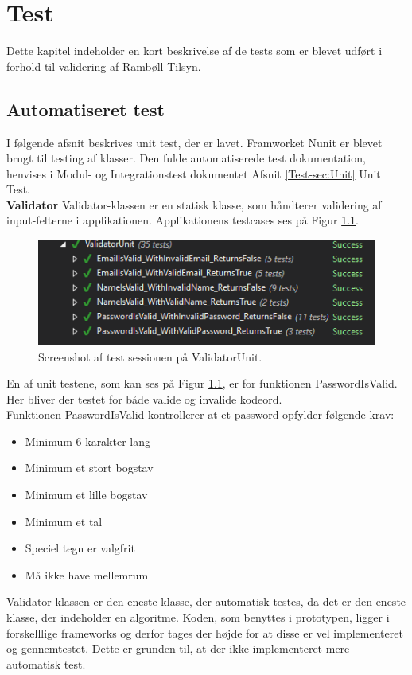 \chapter{Test}
Dette kapitel indeholder en kort beskrivelse af de tests som er blevet udført i forhold til validering af Rambøll Tilsyn. \\

\section{Automatiseret test}
I følgende afsnit beskrives unit test, der er lavet. Framworket Nunit\cite{NUnit} er blevet brugt til testing af klasser. Den fulde automatiserede test dokumentation, henvises i Modul- og Integrationstest dokumentet Afsnit \ref{Test-sec:Unit} Unit Test. \\

\textbf{Validator}
Validator-klassen er en statisk klasse, som håndterer validering af input-felterne i applikationen. Applikationens testcases ses på Figur \ref{fig:ValidatorUnit}.
\begin{figure}[H]
	\centering
	\includegraphics[width=0.6\linewidth]{Test/ValidatorUnit}
	\caption{Screenshot af test sessionen på ValidatorUnit.}
	\label{fig:ValidatorUnit}
\end{figure}

En af unit testene, som kan ses på Figur \ref{fig:ValidatorUnit}, er for funktionen PasswordIsValid. Her bliver der testet for både valide og invalide kodeord.\\
Funktionen PasswordIsValid kontrollerer at et password opfylder følgende krav:
\begin{itemize}
	\item Minimum 6 karakter lang
	\item Minimum et stort bogstav
	\item Minimum et lille bogstav
	\item Minimum et tal
	\item Speciel tegn er valgfrit
	\item Må ikke have mellemrum
\end{itemize}

Validator-klassen er den eneste klasse, der automatisk testes, da det er den eneste klasse, der indeholder en algoritme. Koden, som benyttes i prototypen, ligger i forskelllige frameworks og derfor tages der højde for at disse er vel implementeret og gennemtestet. Dette er grunden til, at der ikke implementeret mere automatisk test. 

